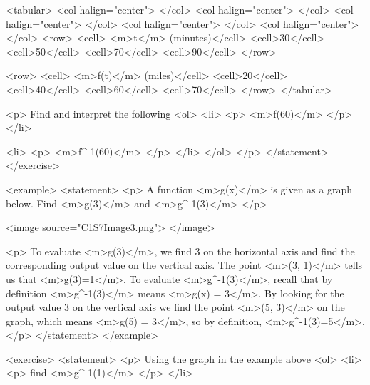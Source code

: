                 <tabular>
                    <col halign="center"> </col> <col halign="center"> </col> <col halign="center"> </col> <col halign="center"> </col> <col halign="center"> </col>
                    <row>
                        <cell> <m>t</m> (minutes)</cell>
                        <cell>30</cell>
                        <cell>50</cell>
                        <cell>70</cell>
                        <cell>90</cell>
                    </row>

                    <row>
                        <cell> <m>f(t)</m> (miles)</cell>
                        <cell>20</cell>
                        <cell>40</cell>
                        <cell>60</cell>
                        <cell>70</cell>
                    </row>
                </tabular>

                <p>
                    Find and interpret the following
                    <ol>
                        <li>
                            <p>
                                <m>f(60)</m>
                            </p>
                        </li>

                        <li>
                            <p>
                                <m>f^{-1}(60)</m>
                            </p>
                        </li>
                    </ol>
                </p>
            </statement>
        </exercise>

        <example>
            <statement>
                <p>
                    A function <m>g(x)</m> is given as a graph below.
                    Find <m>g(3)</m> and <m>g^{-1}(3)</m>
                </p>

                <image source="C1S7Image3.png">
                </image>

                <p>
                    To evaluate <m>g(3)</m>, we find 3 on the horizontal axis and find the corresponding output value on the vertical axis.
                    The point <m>(3, 1)</m> tells us that <m>g(3)=1</m>.
                    To evaluate <m>g^{-1}(3)</m>, recall that by definition <m>g^{-1}(3)</m> means <m>g(x) = 3</m>.
                    By looking for the output value 3 on the vertical axis we find the point <m>(5, 3)</m> on the graph, which means <m>g(5) = 3</m>, so by definition, <m>g^{-1}(3)=5</m>.
                </p>
            </statement>
        </example>

        <exercise>
            <statement>
                <p>
                    Using the graph in the example above
                    <ol>
                        <li>
                            <p>
                                find <m>g^{-1}(1)</m>
                            </p>
                        </li>

